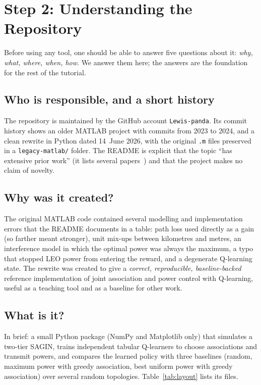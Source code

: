 \documentclass[11pt,a4paper]{article}
\begin{document}
\section{Step 2: Understanding the Repository}
\label{sec:understand}

Before using any tool, one should be able to answer five questions about it: \emph{why, what, where, when, how}. We answer them here; the answers are the foundation for the rest of the tutorial.

\subsection{Who is responsible, and a short history}
The repository is maintained by the GitHub account \texttt{Lewis-panda}. Its commit history shows an older MATLAB project with commits from 2023 to 2024, and a clean rewrite in Python dated 14~June 2026, with the original \texttt{.m} files preserved in a \texttt{legacy-matlab/} folder. The README is explicit that the topic ``has extensive prior work'' (it lists several papers~\cite{alsharoa2022,mlsched2022,dqlhaps2022,interplay2024}) and that the project makes no claim of novelty.

\subsection{Why was it created?}
The original MATLAB code contained several modelling and implementation errors that the README documents in a table: path loss used directly as a gain (so farther meant stronger), unit mix-ups between kilometres and metres, an interference model in which the optimal power was always the maximum, a typo that stopped LEO power from entering the reward, and a degenerate Q-learning state. The rewrite was created to give a \emph{correct, reproducible, baseline-backed} reference implementation of joint association and power control with Q-learning, useful as a teaching tool and as a baseline for other work.

\subsection{What is it?}
In brief: a small Python package (NumPy and Matplotlib only) that simulates a two-tier SAGIN, trains independent tabular Q-learners to choose associations and transmit powers, and compares the learned policy with three baselines (random, maximum power with greedy association, best uniform power with greedy association) over several random topologies. Table~\ref{tab:layout} lists its files.
\end{document}
